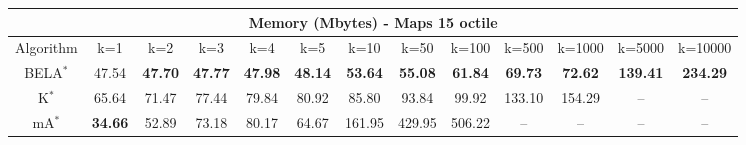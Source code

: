\begin{tabular}{c|cccccccccccc}\toprule
\multicolumn{13}{c}{Memory (Mbytes) - Maps 15 octile}\\ \midrule
Algorithm & k=1 & k=2 & k=3 & k=4 & k=5 & k=10 & k=50 & k=100 & k=500 & k=1000 & k=5000 & k=10000 \\ \midrule
BELA$^*$ & 47.54 & \textbf{47.70} & \textbf{47.77} & \textbf{47.98} & \textbf{48.14} & \textbf{53.64} & \textbf{55.08} & \textbf{61.84} & \textbf{69.73} & \textbf{72.62} & \textbf{139.41} & \textbf{234.29} \\
K$^*$ & 65.64 & 71.47 & 77.44 & 79.84 & 80.92 & 85.80 & 93.84 & 99.92 & 133.10 & 154.29 & -- & -- \\
mA$^*$ & \textbf{34.66} & 52.89 & 73.18 & 80.17 & 64.67 & 161.95 & 429.95 & 506.22 & -- & -- & -- & -- \\ \bottomrule 
\end{tabular}
